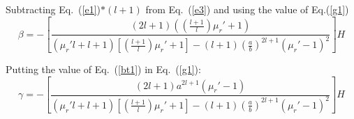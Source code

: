 Subtracting Eq.~(\ref{e1})$*(l+1)$ from Eq.~(\ref{e3}) and using the value of Eq.(\ref{g1})
\begin{equation}\label{bt1}
\beta=-\left[\frac{(2l+1)\left(\left(\frac{l+1}{l}\right)\mu_r'+1\right)}{(\mu_r'l+l+1)\left[\left(\frac{l+1}{l}\right)\mu_r'+1\right]-(l+1)\left(\frac{a}{b}\right)^{2l+1}(\mu_r'-1)^2}\right]H
\end{equation}



Putting the value of Eq.~(\ref{bt1}) in Eq.~(\ref{g1}):
\begin{equation}\label{g2}
\gamma=-\left[\frac{(2l+1)a^{2l+1}(\mu_r'-1)}{(\mu_r'l+l+1)\left[\left(\frac{l+1}{l}\right)\mu_r'+1\right]-(l+1)\left(\frac{a}{b}\right)^{2l+1}(\mu_r'-1)^2}\right] H    
\end{equation}


